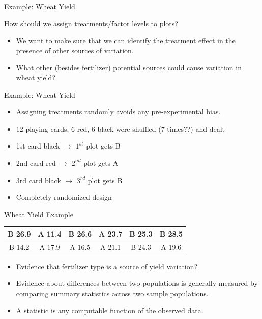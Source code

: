 \documentclass[10pt,ignorenonframetext,]{beamer}
\providecommand{\tightlist}{%
\setlength{\itemsep}{0pt}\setlength{\parskip}{0pt}}
\begin{document}
\begin{frame}{Example: Wheat Yield}

How should we assign treatments/factor levels to plots?

\begin{itemize}
\item
  We want to make sure that we can identify the treatment effect in the
  presence of other sources of variation.
\item
  What other (besides fertilizer) potential sources could cause
  variation in wheat yield?
\end{itemize}

\end{frame}

\begin{frame}{Example: Wheat Yield}

\begin{itemize}
\item
  Assigning treatments randomly avoids any pre-experimental bias.
\item
  12 playing cards, 6 red, 6 black were shuffled (7 times??) and dealt
\item
  1st card black \(\rightarrow\) \(1^{st}\) plot gets B
\item
  2nd card red \(\rightarrow\) \(2^{nd}\) plot gets A
\item
  3rd card black \(\rightarrow\) \(3^{rd}\) plot gets B
\item
  Completely randomized design
\end{itemize}

\end{frame}

\begin{frame}{Wheat Yield Example}

\begin{table}[]
\centering
\label{my-label}
\begin{tabular}{|c|c|c|c|c|c|}
\hline
B 26.9 & A 11.4 & B 26.6     & A 23.7 & B 25.3 & B 28.5 \\ \hline
B 14.2 & A 17.9 & A 16.5 & A 21.1 & B 24.3 & A  19.6 \\ \hline
\end{tabular}
\end{table}

\begin{itemize}
\tightlist
\item
  Evidence that fertilizer type is a source of yield variation?
\item
  Evidence about differences between two populations is generally
  measured by comparing summary statistics across two sample
  populations.
\item
  A statistic is any computable function of the observed data.
\end{itemize}

\end{frame}
\end{document}
